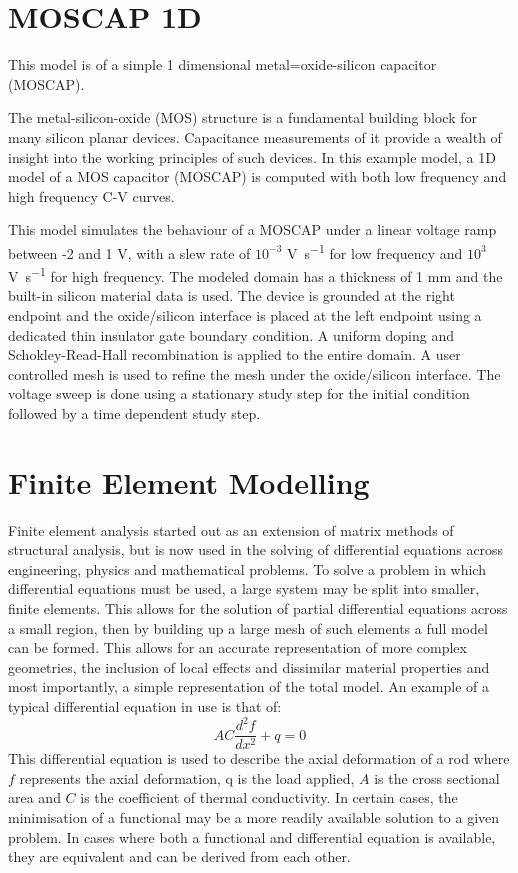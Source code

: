 \section{MOSCAP 1D}

This model is of a simple 1 dimensional metal=oxide-silicon capacitor (MOSCAP).

The metal-silicon-oxide (MOS) structure is a fundamental building block for many silicon planar devices. Capacitance measurements of it provide a wealth of insight into the working principles of such devices. In this example model, a 1D model of a MOS capacitor (MOSCAP) is computed with both low frequency and high frequency C-V curves.

This model simulates the behaviour of a MOSCAP under a linear voltage ramp between -2 and 1 \si{\volt}, with a slew rate of $10^{-3}$ \si{\volt\per\second} for low frequency and $10^{3}$ \si{\volt\per\second} for high frequency. The modeled domain has a thickness of 1 \si{\milli\metre} and the built-in silicon material data is used. The device is grounded at the right endpoint and the oxide/silicon interface is placed at the left endpoint using a dedicated thin insulator gate boundary condition. A uniform doping and Schokley-Read-Hall recombination is applied to the entire domain. A user controlled mesh is used to refine the mesh under the oxide/silicon interface. The voltage sweep is done using a stationary study step for the initial condition followed by a time dependent study step.
\section{Finite Element Modelling}
Finite element analysis started out as an extension of matrix methods of structural analysis, but is now used in the solving of differential equations across engineering, physics and mathematical problems. To solve a problem in which differential equations must be used, a large system may be split into smaller, finite elements. This allows for the solution of partial differential equations across a small region, then by building up a large mesh of such elements a full model can be formed. This allows for an accurate representation of more complex geometries, the inclusion of local effects and dissimilar material properties and most importantly, a simple representation of the total model. An example of a typical differential equation in use is that of:
\begin{equation}
	AC\frac{d^{2}f}{dx^{2}}+q=0
\end{equation}
This differential equation is used to describe the axial deformation of a rod where $f$ represents the axial deformation, q is the load applied, $A$ is the cross sectional area and $C$ is the coefficient of thermal conductivity. In certain cases, the minimisation of a functional may be a more readily available solution to a given problem. In cases where both a functional and differential equation is available, they are equivalent and can be derived from each other. 

